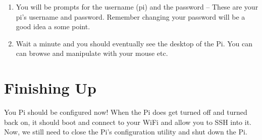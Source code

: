 \documentclass{article}
\begin{document}
\begin{enumerate}
  \item You will be prompts for the username (pi) and the password -- These are your pi's username and password. Remember changing your password will be a good idea a some point.
  \item Wait a minute and you should eventually see the desktop of the Pi. You can can browse and manipulate with your mouse etc.
\end{enumerate}

\section{Finishing Up}

You Pi should be configured now! When the Pi does get turned off and turned back on, it should boot and connect to your WiFi and allow you to SSH into it. Now, we still need to close the Pi's configuration utility and shut down the Pi.
\end{document}
